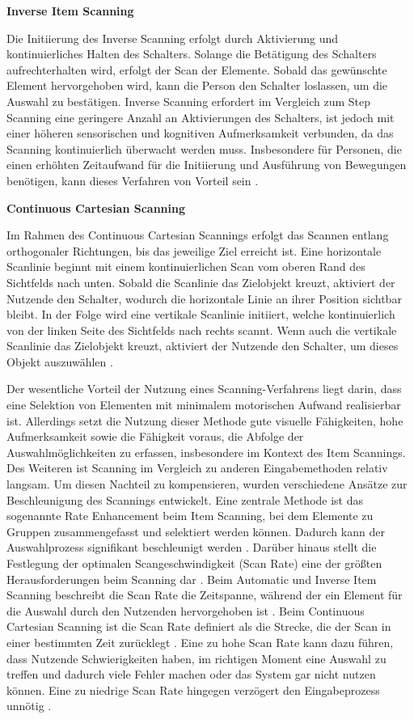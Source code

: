 {\normalfont \bfseries Inverse Item Scanning} 

Die Initiierung des Inverse Scanning erfolgt durch Aktivierung und kontinuierliches Halten des Schalters. Solange die Betätigung des Schalters aufrechterhalten wird, erfolgt der Scan der Elemente. Sobald das gewünschte Element hervorgehoben wird, kann die Person den Schalter loslassen, um die Auswahl zu bestätigen. Inverse Scanning erfordert im Vergleich zum Step Scanning eine geringere Anzahl an Aktivierungen des Schalters, ist jedoch mit einer höheren sensorischen und kognitiven Aufmerksamkeit verbunden, da das Scanning kontinuierlich überwacht werden muss. Insbesondere für Personen, die einen erhöhten Zeitaufwand für die Initiierung und Ausführung von Bewegungen benötigen, kann dieses Verfahren von Vorteil sein \citep{COOK2015117}. 

{\normalfont \bfseries Continuous Cartesian Scanning}

Im Rahmen des Continuous Cartesian Scannings erfolgt das Scannen entlang orthogonaler Richtungen, bis das jeweilige Ziel erreicht ist. Eine horizontale Scanlinie beginnt mit einem kontinuierlichen Scan vom oberen Rand des Sichtfelds nach unten. Sobald die Scanlinie das Zielobjekt kreuzt, aktiviert der Nutzende den Schalter, wodurch die horizontale Linie an ihrer Position sichtbar bleibt. In der Folge wird eine vertikale Scanlinie initiiert, welche kontinuierlich von der linken Seite des Sichtfelds nach rechts scannt. Wenn auch die vertikale Scanlinie das Zielobjekt kreuzt, aktiviert der Nutzende den Schalter, um dieses Objekt auszuwählen \citep{Blackstien-Adler30062004}.

Der wesentliche Vorteil der Nutzung eines Scanning-Verfahrens liegt darin, dass eine Selektion von Elementen mit minimalem motorischen Aufwand realisierbar ist. Allerdings setzt die Nutzung dieser Methode gute visuelle Fähigkeiten, hohe Aufmerksamkeit sowie die Fähigkeit voraus, die Abfolge der Auswahlmöglichkeiten zu erfassen, insbesondere im Kontext des Item Scannings. Des Weiteren ist Scanning im Vergleich zu anderen Eingabemethoden relativ langsam. Um diesen Nachteil zu kompensieren, wurden verschiedene Ansätze zur Beschleunigung des Scannings entwickelt. Eine zentrale Methode ist das sogenannte Rate Enhancement beim Item Scanning, bei dem Elemente zu Gruppen zusammengefasst und selektiert werden können. Dadurch kann der Auswahlprozess signifikant beschleunigt werden \citep{COOK2015117}. 
Darüber hinaus stellt die Festlegung der optimalen Scangeschwindigkeit (Scan Rate) eine der größten Herausforderungen beim Scanning dar \citep{COOK2015117}. Beim Automatic und Inverse Item Scanning beschreibt die Scan Rate die Zeitspanne, während der ein Element für die Auswahl durch den Nutzenden hervorgehoben ist \citep{Simpson30062007}. Beim Continuous Cartesian Scanning ist die Scan Rate definiert als die Strecke, die der Scan in einer bestimmten Zeit zurücklegt \citep{Blackstien-Adler30062004}. Eine zu hohe Scan Rate kann dazu führen, dass Nutzende Schwierigkeiten haben, im richtigen Moment eine Auswahl zu treffen und dadurch viele Fehler machen oder das System gar nicht nutzen können. Eine zu niedrige Scan Rate hingegen verzögert den Eingabeprozess unnötig \citep{Simpson30062007}.  

